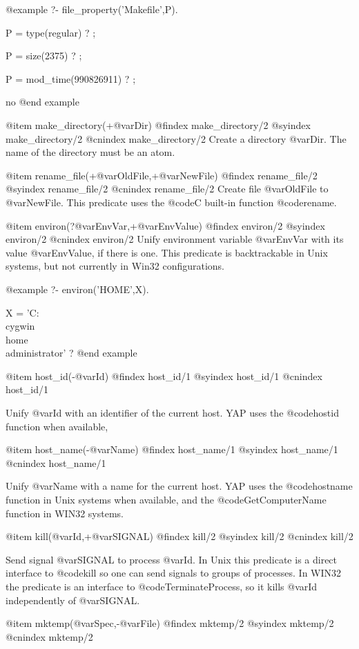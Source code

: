 {{{{{{{{@example
   ?- file_property('Makefile',P).

P = type(regular) ? ;

P = size(2375) ? ;

P = mod_time(990826911) ? ;

no
@end example

@item make_directory(+@var{Dir})
@findex  make_directory/2
@syindex make_directory/2
@cnindex make_directory/2
Create a directory @var{Dir}. The name of the directory must be an atom.

@item rename_file(+@var{OldFile},+@var{NewFile})
@findex  rename_file/2
@syindex rename_file/2
@cnindex rename_file/2
Create file @var{OldFile} to @var{NewFile}. This predicate uses the
@code{C} built-in function @code{rename}.


@item environ(?@var{EnvVar},+@var{EnvValue})
@findex  environ/2
@syindex environ/2
@cnindex environ/2
Unify environment variable @var{EnvVar} with its value @var{EnvValue},
if there is one. This predicate is backtrackable in Unix systems, but
not currently in Win32 configurations.

@example
   ?- environ('HOME',X).

X = 'C:\\cygwin\\home\\administrator' ?
@end example

@item host_id(-@var{Id})
@findex  host_id/1
@syindex host_id/1
@cnindex host_id/1

Unify @var{Id} with an identifier of the current host. YAP uses the
@code{hostid} function when available, 

@item host_name(-@var{Name})
@findex  host_name/1
@syindex host_name/1
@cnindex host_name/1

Unify @var{Name} with a name for the current host. YAP uses the
@code{hostname} function in Unix systems when available, and the
@code{GetComputerName} function in WIN32 systems. 

@item kill(@var{Id},+@var{SIGNAL})
@findex  kill/2
@syindex kill/2
@cnindex kill/2

Send signal @var{SIGNAL} to process @var{Id}. In Unix this predicate is
a direct interface to @code{kill} so one can send signals to groups of
processes. In WIN32 the predicate is an interface to
@code{TerminateProcess}, so it kills @var{Id} independently of @var{SIGNAL}.

@item mktemp(@var{Spec},-@var{File})
@findex  mktemp/2
@syindex mktemp/2
@cnindex mktemp/2

}}}}}}}}
